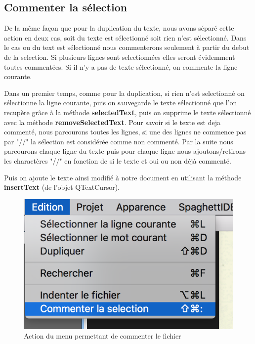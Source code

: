 \documentclass[a4paper,12pt]{article}
\begin{document}
\subsection{Commenter la sélection}

	De la même façon que pour la duplication du texte, nous avons séparé cette action en deux cas, soit du texte est sélectionné soit rien n'est sélectionné.
	Dans le cas ou du text est sélectionné nous commenterons seulement à partir du debut de la selection. Si plusieurs lignes sont selectionnées elles seront évidemment toutes commentées. Si il n'y a pas de texte sélectionné, on commente la ligne courante.

	Dans un premier temps, comme pour la duplication, si rien n'est selectionné on sélectionne la ligne courante, puis on sauvegarde le texte sélectionné que l'on recupère grâce à la méthode \textbf{selectedText}, puis on supprime le texte sélectionné avec la méthode \textbf{removeSelectedText}. Pour savoir si le texte est deja commenté, nous parcourons toutes les lignes, si une des lignes ne commence pas par "//" la sélection est considérée comme non commenté. Par la suite nous parcourons chaque ligne du texte puis pour chaque ligne nous ajoutons/retirons les charactères "//" en fonction de si le texte et oui ou non déjà commenté.

	Puis on ajoute le texte ainsi modifié à notre document en utilisant la méthode \textbf{insertText} (de l'objet QTextCursor).

	\begin{figure}[h!]

		\begin{center}
			\includegraphics[scale=0.8]{images/imgs_edit/utilisation_commentaire}
			\caption{Action du menu permettant de commenter le fichier}
		\end{center}
	\end{figure}
\end{document}
